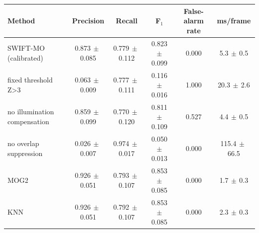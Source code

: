 \begin{tabular}{lccccc}\toprule
Method & Precision & Recall & F$_1$ & False-alarm rate & ms/frame \\\midrule
SWIFT-MO (calibrated) & 0.873$\,\pm\,$0.085 & 0.779$\,\pm\,$0.112 & 0.823$\,\pm\,$0.099 & 0.000 & 5.3$\,\pm\,$0.5 \\
fixed threshold Z>3 & 0.063$\,\pm\,$0.009 & 0.777$\,\pm\,$0.111 & 0.116$\,\pm\,$0.016 & 1.000 & 20.3$\,\pm\,$2.6 \\
no illumination compensation & 0.859$\,\pm\,$0.099 & 0.770$\,\pm\,$0.120 & 0.811$\,\pm\,$0.109 & 0.527 & 4.4$\,\pm\,$0.5 \\
no overlap suppression & 0.026$\,\pm\,$0.007 & 0.974$\,\pm\,$0.017 & 0.050$\,\pm\,$0.013 & 0.000 & 115.4$\,\pm\,$66.5 \\
MOG2 & 0.926$\,\pm\,$0.051 & 0.793$\,\pm\,$0.107 & 0.853$\,\pm\,$0.085 & 0.000 & 1.7$\,\pm\,$0.3 \\
KNN & 0.926$\,\pm\,$0.051 & 0.792$\,\pm\,$0.107 & 0.853$\,\pm\,$0.085 & 0.000 & 2.3$\,\pm\,$0.3 \\
\bottomrule\end{tabular}
